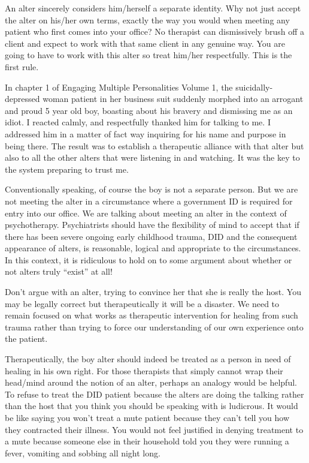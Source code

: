 \documentclass[]{book}
\begin{document}
An alter sincerely considers him/herself a separate identity. Why not just accept the alter on his/her own terms, exactly the way you would when meeting any patient who first comes into your office? No therapist can dismissively brush off a client and expect to work with that same client in any genuine way. You are going to have to work with this alter so treat him/her respectfully. This is the first rule.

In chapter 1 of Engaging Multiple Personalities Volume 1, the suicidally-depressed woman patient in her business suit suddenly morphed into an arrogant and proud 5 year old boy, boasting about his bravery and dismissing me as an idiot. I reacted calmly, and respectfully thanked him for talking to me. I addressed him in a matter of fact way inquiring for his name and purpose in being there. The result was to establish a therapeutic alliance with that alter but also to all the other alters that were listening in and watching. It was the key to the system preparing to trust me.

Conventionally speaking, of course the boy is not a separate person. But we are not meeting the alter in a circumstance where a government ID is required for entry into our office. We are talking about meeting an alter in the context of psychotherapy. Psychiatrists should have the flexibility of mind to accept that if there has been severe ongoing early childhood trauma, DID and the consequent appearance of alters, is reasonable, logical and appropriate to the circumstances. In this context, it is ridiculous to hold on to some argument about whether or not alters truly ``exist'' at all!

Don't argue with an alter, trying to convince her that she is really the host. You may be legally correct but therapeutically it will be a disaster. We need to remain focused on what works as therapeutic intervention for healing from such trauma rather than trying to force our understanding of our own experience onto the patient.

Therapeutically, the boy alter should indeed be treated as a person in need of healing in his own right. For those therapists that simply cannot wrap their head/mind around the notion of an alter, perhaps an analogy would be helpful. To refuse to treat the DID patient because the alters are doing the talking rather than the host that you think you should be speaking with is ludicrous. It would be like saying you won't treat a mute patient because they can't tell you how they contracted their illness. You would not feel justified in denying treatment to a mute because someone else in their household told you they were running a fever, vomiting and sobbing all night long.
\end{document}
